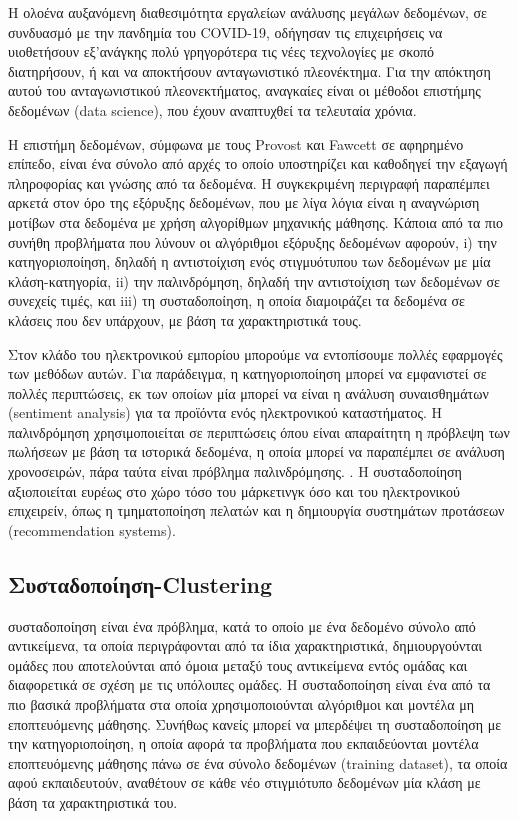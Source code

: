\documentclass[greek, 12pt]{article}
\begin{document}
Η ολοένα αυξανόμενη διαθεσιμότητα εργαλείων ανάλυσης μεγάλων δεδομένων, σε συνδυασμό με την πανδημία του COVID-19, οδήγησαν τις επιχειρήσεις να υιοθετήσουν εξ’ανάγκης πολύ γρηγορότερα τις νέες τεχνολογίες με σκοπό διατηρήσουν, ή και να αποκτήσουν ανταγωνιστικό πλεονέκτημα. \cite{fedirko2021data} Για την απόκτηση αυτού του ανταγωνιστικού πλεονεκτήματος, αναγκαίες είναι οι μέθοδοι επιστήμης δεδομένων (data science), που έχουν αναπτυχθεί τα τελευταία χρόνια.

Η επιστήμη δεδομένων, σύμφωνα με τους Provost και Fawcett σε αφηρημένο επίπεδο, είναι ένα σύνολο από αρχές το οποίο υποστηρίζει και καθοδηγεί την εξαγωγή πληροφορίας και γνώσης από τα δεδομένα. \cite{provost2013data} Η συγκεκριμένη περιγραφή παραπέμπει αρκετά στον όρο της εξόρυξης δεδομένων, που με λίγα λόγια είναι η αναγνώριση μοτίβων στα δεδομένα με χρήση αλγορίθμων μηχανικής μάθησης. \cite{fayyad1996kdd} Κάποια από τα πιο συνήθη προβλήματα που λύνουν οι αλγόριθμοι εξόρυξης δεδομένων αφορούν, i) την κατηγοριοποίηση, δηλαδή η αντιστοίχιση ενός στιγμυότυπου των δεδομένων με μία κλάση-κατηγορία, ii) την παλινδρόμηση, δηλαδή την αντιστοίχιση των δεδομένων σε συνεχείς τιμές, και iii) τη συσταδοποίηση, η οποία διαμοιράζει τα δεδομένα σε κλάσεις που δεν υπάρχουν, με βάση τα χαρακτηριστικά τους.

Στον κλάδο του ηλεκτρονικού εμπορίου μπορούμε να εντοπίσουμε πολλές εφαρμογές των μεθόδων αυτών. Για παράδειγμα, η κατηγοριοποίηση μπορεί να εμφανιστεί σε πολλές περιπτώσεις, εκ των οποίων μία μπορεί να είναι η ανάλυση συναισθημάτων (sentiment analysis) για τα προϊόντα ενός ηλεκτρονικού καταστήματος. \cite{xu2020commerce} Η παλινδρόμηση χρησιμοποιείται σε περιπτώσεις όπου είναι απαραίτητη η πρόβλεψη των πωλήσεων με βάση τα ιστορικά δεδομένα, η οποία μπορεί να παραπέμπει σε ανάλυση χρονοσειρών, πάρα ταύτα είναι πρόβλημα παλινδρόμησης. \cite{kohli2020sales}. Η συσταδοποίηση αξιοποιείται ευρέως στο χώρο τόσο του μάρκετινγκ όσο και του ηλεκτρονικού επιχειρείν, όπως η τμηματοποίηση πελατών \cite{kamthania2018market} και η δημιουργία συστημάτων προτάσεων (recommendation systems). \cite{bandyopadhyay2021product}

\subsection{Συσταδοποίηση-Clustering}

 συσταδοποίηση είναι ένα πρόβλημα, κατά το οποίο με ένα δεδομένο σύνολο από αντικείμενα, τα οποία περιγράφονται από τα ίδια χαρακτηριστικά, δημιουργούνται ομάδες που αποτελούνται από όμοια μεταξύ τους αντικείμενα εντός ομάδας και διαφορετικά σε σχέση με τις υπόλοιπες ομάδες. \cite{bonner1964some} Η συσταδοποίηση είναι ένα από τα πιο βασικά προβλήματα στα οποία χρησιμοποιούνται αλγόριθμοι και μοντέλα μη εποπτευόμενης μάθησης. \cite{popat2014review} Συνήθως κανείς μπορεί να μπερδέψει τη συσταδοποίηση με την κατηγοριοποίηση, η οποία αφορά τα προβλήματα που εκπαιδεύονται μοντέλα εποπτευόμενης μάθησης πάνω σε ένα σύνολο δεδομένων (training dataset), τα οποία αφού εκπαιδευτούν, αναθέτουν σε κάθε νέο στιγμιότυπο δεδομένων μία κλάση με βάση τα χαρακτηριστικά του. \cite{sen2020supervised}
\end{document}
